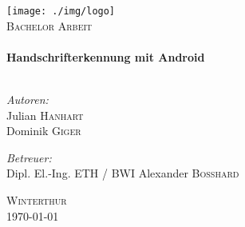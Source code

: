 \begin{titlepage}
 
\begin{center}
 
 
\texttt{[image: ./img/logo]}\\[2cm]
 

 
\textsc{\Large Bachelor Arbeit}\\[0.5cm]
 
 
\HRule \\[0.4cm]
{ \huge \bfseries Handschrifterkennung mit Android}\\[0.4cm]
 
\HRule \\[1.5cm]
 
\begin{minipage}{0.4\textwidth}
\begin{flushleft} \large
\emph{Autoren:}\\
Julian \textsc{Hanhart}\\
Dominik \textsc{Giger}
\end{flushleft}
\end{minipage}
\begin{minipage}{0.4\textwidth}
\begin{flushright} \large
\emph{Betreuer:} \\ 
Dipl. El.-Ing. ETH / BWI Alexander \textsc{Bosshard}\\
 
\end{flushright}
\end{minipage}
 
\vfill
 
\textsc{Winterthur}\\
{\large \today}
 
\end{center}
 
\end{titlepage}
